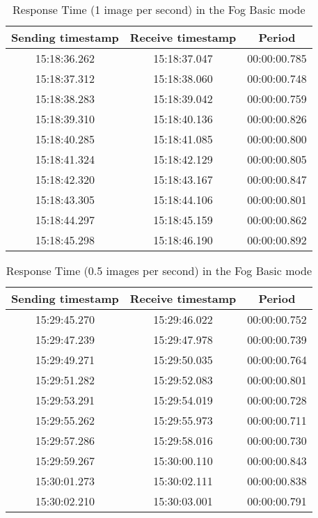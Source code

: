 \begin{table}[h!]
\centering
\begin{tabular}{ |c|c|c| } 
 \hline
 Sending timestamp &    Receive timestamp &    Period\\
 \hline
 
15:18:36.262 &	15:18:37.047 &	00:00:00.785 \\
15:18:37.312 &	15:18:38.060 &	00:00:00.748 \\
15:18:38.283 &	15:18:39.042 &	00:00:00.759 \\
15:18:39.310 &	15:18:40.136 &	00:00:00.826 \\
15:18:40.285 &	15:18:41.085 &	00:00:00.800 \\
15:18:41.324 &	15:18:42.129 &	00:00:00.805 \\
15:18:42.320 &	15:18:43.167 &	00:00:00.847 \\
15:18:43.305 &	15:18:44.106 &	00:00:00.801 \\
15:18:44.297 &	15:18:45.159 &	00:00:00.862 \\
15:18:45.298 &	15:18:46.190 &	00:00:00.892 \\
 \hline
\end{tabular}
\caption{Response Time (1 image per second) in the Fog Basic mode}
\label{table:measure_response_time_basic_1}
\end{table}

\begin{table}[h!]
\centering
\begin{tabular}{ |c|c|c| } 
 \hline
 Sending timestamp &    Receive timestamp &    Period\\
 \hline
 
15:29:45.270 &	15:29:46.022 &	00:00:00.752 \\
15:29:47.239 &	15:29:47.978 &	00:00:00.739 \\
15:29:49.271 &	15:29:50.035 &	00:00:00.764 \\
15:29:51.282 &	15:29:52.083 &	00:00:00.801 \\
15:29:53.291 &	15:29:54.019 &	00:00:00.728 \\
15:29:55.262 &	15:29:55.973 &	00:00:00.711 \\
15:29:57.286 &	15:29:58.016 &	00:00:00.730 \\
15:29:59.267 &	15:30:00.110 &	00:00:00.843 \\
15:30:01.273 &	15:30:02.111 &	00:00:00.838 \\
15:30:02.210 &	15:30:03.001 &	00:00:00.791 \\
 \hline
\end{tabular}
\caption{Response Time (0.5 images per second) in the Fog Basic mode}
\label{table:measure_response_time_basic_2}
\end{table}

